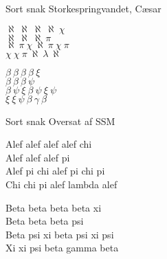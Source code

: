 \begin{song}{Sort snak}
  {} %
  {Storkespringvandet, Cæsar} %
  {} %
  {} %
  {\NotCCLIed} %

  \begin{SBVerse}
    $\aleph\ \aleph\ \aleph\ \aleph\ \chi$\\
    $\aleph\ \aleph\ \aleph\ \pi$\\
    $\aleph\ \pi\ \chi\ \aleph\ \pi\ \chi\ \pi$\\
    $\chi\ \chi\ \pi\ \aleph\ \lambda\ \aleph$
  \end{SBVerse}

  \begin{SBVerse}
    $\beta\ \beta\ \beta\ \beta\ \xi$\\
    $\beta\ \beta\ \beta\ \psi$\\
    $\beta\ \psi\ \xi\ \beta\ \psi\ \xi\ \psi$\\
    $\xi\ \xi\ \psi\ \beta\ \gamma\ \beta$
  \end{SBVerse}
\CBPageBrk
  \begin{xlatn}{Sort snak}
    {}
    {Oversat af SSM}

    \begin{SBVerse}
      Alef alef alef alef chi\\
      Alef alef alef pi\\
      Alef pi chi alef pi chi pi\\
      Chi chi pi alef lambda alef
    \end{SBVerse}
    \begin{SBVerse}
      Beta beta beta beta xi\\
      Beta beta beta psi\\
      Beta psi xi beta psi xi psi\\
      Xi xi psi beta gamma beta
    \end{SBVerse}
  \end{xlatn}
\end{song}
